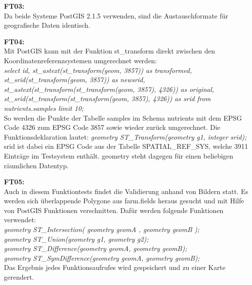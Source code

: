 \textbf{FT03:}\\
Da beide Systeme PostGIS 2.1.5 verwenden, sind die Austauschformate für geografische Daten identisch.

\textbf{FT04:}\\
Mit PostGIS kann mit der Funktion st\_{}transform direkt zwischen den Koordinatenreferenzsystemen umgerechnet werden:\\
\textit{select id, st\_{}astext(st\_{}transform(geom, 3857)) as transformed, st\_{}srid(st\_{}transform(geom, 3857)) as newsrid, st\_{}astext(st\_{}transform(st\_{}transform(geom, 3857), 4326)) as original, st\_{}srid(st\_{}transform(st\_{}transform(geom, 3857), 4326)) as srid from nutrients.samples limit 10;}\\
So werden die Punkte der Tabelle samples im Schema nutrients mit dem EPSG Code 4326 zum EPSG Code 3857 sowie wieder zurück umgerechnet.
Die Funktionsdeklaration lautet:
\textit{geometry ST\_{}Transform(geometry g1, integer srid);}\\
srid ist dabei ein EPSG Code aus der Tabelle SPATIAL\_{}REF\_{}SYS, welche 3911 Einträge im Testsystem enthält.
geometry steht dagegen für einen beliebigen räumlichen Datentyp.

\textbf{FT05:}\\
Auch in diesem Funktiontests findet die Validierung anhand von Bildern statt.
Es werden sich überlappende Polygone aus farm.fields heraus gesucht und mit Hilfe von PostGIS Funktionen verschnitten.
Dafür werden folgende Funktionen verwendet:\\
\textit{geometry ST\_{}Intersection( geometry geomA , geometry geomB );}\\
\textit{geometry ST\_{}Union(geometry g1, geometry g2);}\\
\textit{geometry ST\_{}Difference(geometry geomA, geometry geomB);}\\
\textit{geometry ST\_{}SymDifference(geometry geomA, geometry geomB);}\\
Das Ergebnis jedes Funktionsaufrufes wird gespeichert und zu einer Karte gerendert.

